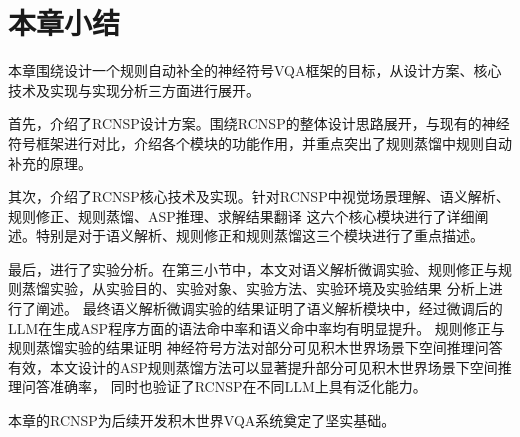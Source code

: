 \section{本章小结}
本章围绕设计一个规则自动补全的神经符号VQA框架的目标，从设计方案、核心技术及实现与实现分析三方面进行展开。

首先，介绍了RCNSP设计方案。围绕RCNSP的整体设计思路展开，与现有的神经符号框架进行对比，介绍各个模块的功能作用，并重点突出了规则蒸馏中规则自动补充的原理。

其次，介绍了RCNSP核心技术及实现。针对RCNSP中视觉场景理解、语义解析、规则修正、规则蒸馏、ASP推理、求解结果翻译
这六个核心模块进行了详细阐述。特别是对于语义解析、规则修正和规则蒸馏这三个模块进行了重点描述。

最后，进行了实验分析。在第三小节中，本文对语义解析微调实验、规则修正与规则蒸馏实验，从实验目的、实验对象、实验方法、实验环境及实验结果
分析上进行了阐述。
最终语义解析微调实验的结果证明了语义解析模块中，经过微调后的LLM在生成ASP程序方面的语法命中率和语义命中率均有明显提升。
规则修正与规则蒸馏实验的结果证明
神经符号方法对部分可见积木世界场景下空间推理问答有效，本文设计的ASP规则蒸馏方法可以显著提升部分可见积木世界场景下空间推理问答准确率，
同时也验证了RCNSP在不同LLM上具有泛化能力。

本章的RCNSP为后续开发积木世界VQA系统奠定了坚实基础。